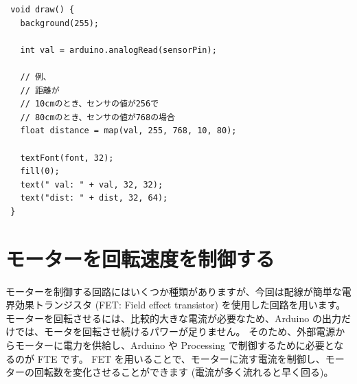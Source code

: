 \documentclass[11pt,a4paper]{jarticle}
\begin{document}
\begin{lstlisting}
 void draw() {
   background(255);

   int val = arduino.analogRead(sensorPin);

   // 例、
   // 距離が
   // 10cmのとき、センサの値が256で
   // 80cmのとき、センサの値が768の場合
   float distance = map(val, 255, 768, 10, 80);

   textFont(font, 32);
   fill(0);
   text(" val: " + val, 32, 32);
   text("dist: " + dist, 32, 64);
 }
\end{lstlisting}


\section{モーターを回転速度を制御する}
モーターを制御する回路にはいくつか種類がありますが、今回は配線が簡単な電界効果トランジスタ (FET: Field effect transistor) を使用した回路を用います。
モーターを回転させるには、比較的大きな電流が必要なため、Arduino の出力だけでは、モータを回転させ続けるパワーが足りません。
そのため、外部電源からモーターに電力を供給し、Arduino や Processing で制御するために必要となるのが FTE です。
FET を用いることで、モーターに流す電流を制御し、モーターの回転数を変化させることができます (電流が多く流れると早く回る)。
\end{document}
